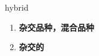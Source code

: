 
\begin{frame}
{\huge hybrid}
\begin{center}
\begin{enumerate}\Large
  \item \textbf{杂交品种，混合品种}
  \item \textbf{杂交的}
\end{enumerate}
\end{center}
\end{frame}

